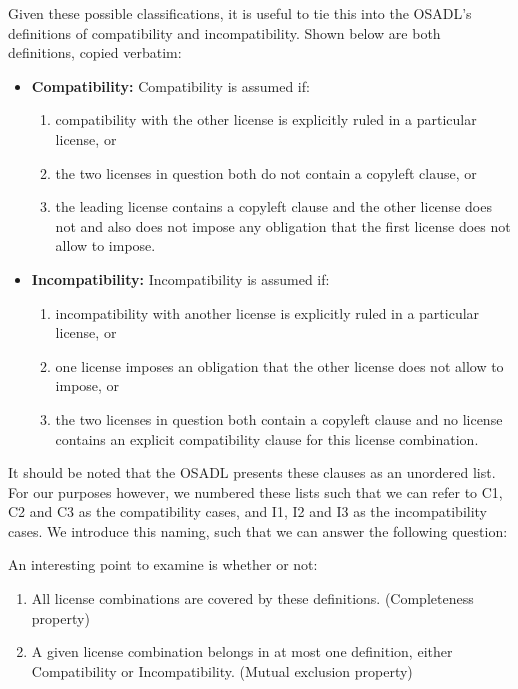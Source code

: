 Given these possible classifications, it is useful to tie this into the OSADL's definitions of compatibility and incompatibility. Shown below are both definitions, copied verbatim:

\begin{itemize}
	\item \textbf{Compatibility:} Compatibility is assumed if:
	\begin{enumerate}
		\item compatibility with the other license is explicitly ruled in a particular license, or
		\item the two licenses in question both do not contain a copyleft clause, or
		\item the leading license contains a copyleft clause and the other license does not and also does not impose any obligation that the first license does not allow to impose.
	\end{enumerate}
	
	\item \textbf{Incompatibility:} Incompatibility is assumed if:
	\begin{enumerate}
		\item incompatibility with another license is explicitly ruled in a particular license, or
		\item one license imposes an obligation that the other license does not allow to impose, or
		\item the two licenses in question both contain a copyleft clause and no license contains an explicit compatibility clause for this license combination.
	\end{enumerate}
\end{itemize}

It should be noted that the OSADL presents these clauses as an unordered list. For our purposes however, we numbered these lists such that we can refer to C1, C2 and C3 as the compatibility cases, and I1, I2 and I3 as the incompatibility cases. We introduce this naming, such that we can answer the following question:

An interesting point to examine is whether or not:
\begin{enumerate}
	\item All license combinations are covered by these definitions. (Completeness property)
	\item A given license combination belongs in at most one definition, either Compatibility or Incompatibility. (Mutual exclusion property)
\end{enumerate}

